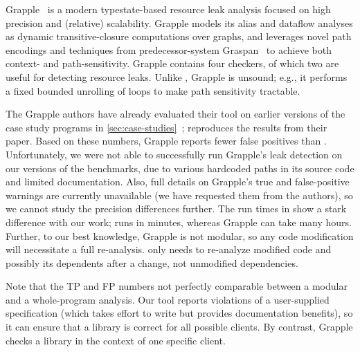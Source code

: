Grapple~\cite{zuo2019grapple} is a modern typestate-based resource leak analysis
focused on high precision and (relative) scalability. Grapple models its alias and
dataflow analyses as dynamic transitive-closure computations over graphs, and
leverages novel path encodings and techniques from predecessor-system
Graspan~\cite{wang2017graspan} to achieve both context- and path-sensitivity.  
Grapple contains four checkers, of which two are useful for detecting
resource leaks.  Unlike \Tool, Grapple is unsound; e.g., it performs a fixed bounded unrolling
of loops to make path sensitivity tractable.

The Grapple authors have already evaluated their tool on earlier
versions of the case study programs in
\cref{sec:case-studies}~\cite{zuo2019grapple};  reproduces the
results from their paper.  Based on these numbers, Grapple reports fewer false
positives than \Tool.  Unfortunately, we were not able to successfully run
Grapple's leak detection on our versions of the benchmarks, due to various
hardcoded paths in its source code and limited documentation. Also, full details
on Grapple's true and false-positive warnings are currently unavailable (we have
requested them from the authors), so we cannot study the precision differences
further.  The run times in  show a stark difference with our
work; \Tool runs in minutes, whereas Grapple can take many hours. Further, to
our best knowledge, Grapple is not modular, so any code modification will
necessitate a full re-analysis. \Tool only needs to re-analyze modified code and
possibly its dependents after a change, not unmodified dependencies.


 Note that the TP and FP numbers not perfectly comparable between a modular
and a whole-program analysis.
Our tool reports violations of a user-supplied specification
(which takes effort to write but provides documentation benefits), so it
can ensure that a library is correct for all possible clients.  By
contrast, Grapple checks a library in the context of one specific client.

